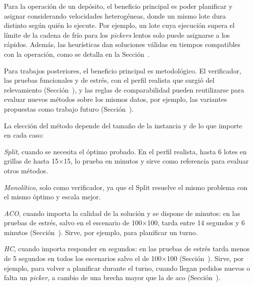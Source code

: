 \stopsubsection

\startsubsection[title={Beneficios}, reference=sec:beneficios]

Para la operación de un depósito, el beneficio principal es poder planificar y asignar
considerando velocidades
heterogéneas, donde un mismo lote dura distinto según quién lo ejecute.
Por ejemplo, un lote cuya ejecución supera el
límite de la cadena de frío para los {\em pickers} lentos solo puede asignarse
a los rápidos. Además, las heurísticas dan soluciones válidas en tiempos
compatibles con la operación, como se detalla en la
Sección~.

Para trabajos posteriores, el beneficio principal es metodológico. El
verificador, las pruebas funcionales y de estrés, con el perfil realista que
surgió del relevamiento (Sección~), y las reglas de
comparabilidad pueden reutilizarse para evaluar nuevos métodos sobre los
mismos datos, por ejemplo, las variantes propuestas como trabajo futuro
(Sección~).

\stopsubsection

\startsubsection[title={Recomendaciones de uso}, reference=sec:recomendaciones]

La elección del método depende del tamaño de la instancia y de lo que importe
en cada caso:
\startitemize
	\item {\em Split}, cuando se necesita el óptimo probado. En el perfil
	realista, hasta 6 lotes en
	grillas de hasta 15×15, lo prueba en minutos y sirve como referencia para
	evaluar otros métodos.
	\item {\em Monolítico}, solo como verificador, ya que el Split resuelve el
	mismo problema con el mismo óptimo y escala mejor.
	\item {\em ACO}, cuando importa la calidad de la solución y se dispone de
	minutos: en las pruebas de estrés, salvo en el escenario de 100×100, tarda
	entre 14 segundos y 6 minutos
	(Sección~). Sirve, por ejemplo, para planificar un
	turno.
	\item {\em HC}, cuando importa responder en segundos: en las pruebas de
	estrés tarda menos de 5 segundos en todos los escenarios salvo el de
	100×100 (Sección~). Sirve, por ejemplo, para volver a
	planificar durante el turno, cuando llegan pedidos nuevos o falta un
	{\em picker}, a cambio de una brecha mayor que la de \ac{aco}
	(Sección~).
\stopitemize

